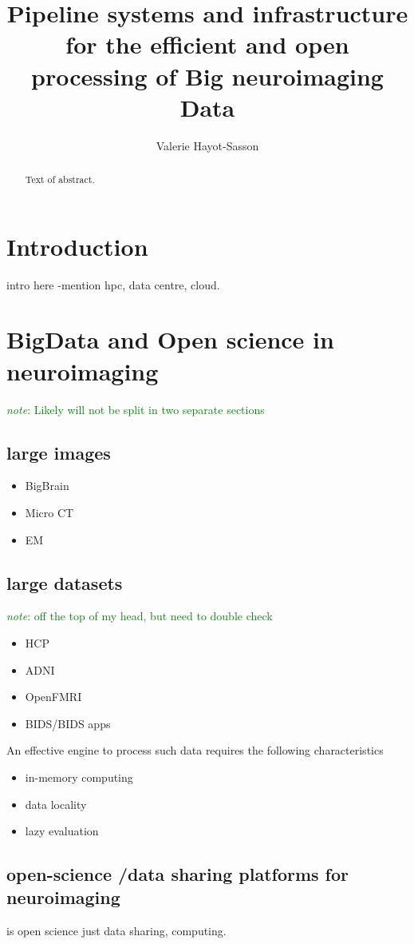 \documentclass{report}
\newcommand{\note}[1]{\textcolor{green}{\textit{note}: #1}}
\begin{document}
\title{Pipeline systems and infrastructure for the efficient and open processing of Big neuroimaging Data}
\author{Valerie Hayot-Sasson}
\maketitle
\begin{abstract}
  Text of abstract.  
\end{abstract}
\tableofcontents
\chapter{Introduction}
intro here -mention hpc, data centre, cloud. 
\chapter{BigData and Open science in neuroimaging}
    \note{Likely will not be split in two separate sections}
    \section{large images}
        \begin{itemize}  
            \item BigBrain
            \item Micro CT 
            \item EM 
        \end{itemize}
    \section{large datasets}
    	\note{off the top of my head, but need to double check}
        \begin{itemize}
            \item HCP
            \item ADNI
            \item OpenFMRI
            \item BIDS/BIDS apps
        \end{itemize}
    An effective engine to process such data requires the following characteristics
        \begin{itemize}
            \item in-memory computing
            \item data locality
            \item lazy evaluation
        \end{itemize}
        \section{open-science /data sharing platforms for neuroimaging}
        		is open science just data sharing, computing. 
\end{document}
